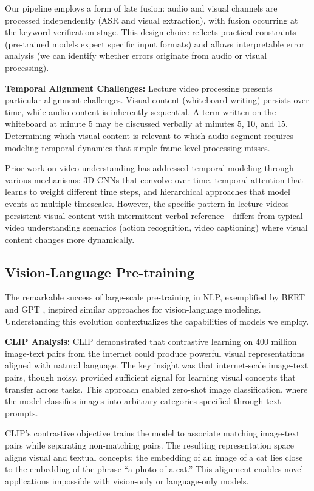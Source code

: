 Our pipeline employs a form of late fusion: audio and visual channels are processed independently (ASR and visual extraction), with fusion occurring at the keyword verification stage. This design choice reflects practical constraints (pre-trained models expect specific input formats) and allows interpretable error analysis (we can identify whether errors originate from audio or visual processing).

\textbf{Temporal Alignment Challenges:} Lecture video processing presents particular alignment challenges. Visual content (whiteboard writing) persists over time, while audio content is inherently sequential. A term written on the whiteboard at minute 5 may be discussed verbally at minutes 5, 10, and 15. Determining which visual content is relevant to which audio segment requires modeling temporal dynamics that simple frame-level processing misses.

Prior work on video understanding has addressed temporal modeling through various mechanisms: 3D CNNs that convolve over time, temporal attention that learns to weight different time steps, and hierarchical approaches that model events at multiple timescales. However, the specific pattern in lecture videos---persistent visual content with intermittent verbal reference---differs from typical video understanding scenarios (action recognition, video captioning) where visual content changes more dynamically.

\subsection{Vision-Language Pre-training}

The remarkable success of large-scale pre-training in NLP, exemplified by BERT \cite{Devlin2019} and GPT \cite{Brown2020}, inspired similar approaches for vision-language modeling. Understanding this evolution contextualizes the capabilities of models we employ.

\textbf{CLIP Analysis:} CLIP \cite{Radford2021} demonstrated that contrastive learning on 400 million image-text pairs from the internet could produce powerful visual representations aligned with natural language. The key insight was that internet-scale image-text pairs, though noisy, provided sufficient signal for learning visual concepts that transfer across tasks. This approach enabled zero-shot image classification, where the model classifies images into arbitrary categories specified through text prompts.

CLIP's contrastive objective trains the model to associate matching image-text pairs while separating non-matching pairs. The resulting representation space aligns visual and textual concepts: the embedding of an image of a cat lies close to the embedding of the phrase ``a photo of a cat.'' This alignment enables novel applications impossible with vision-only or language-only models.

